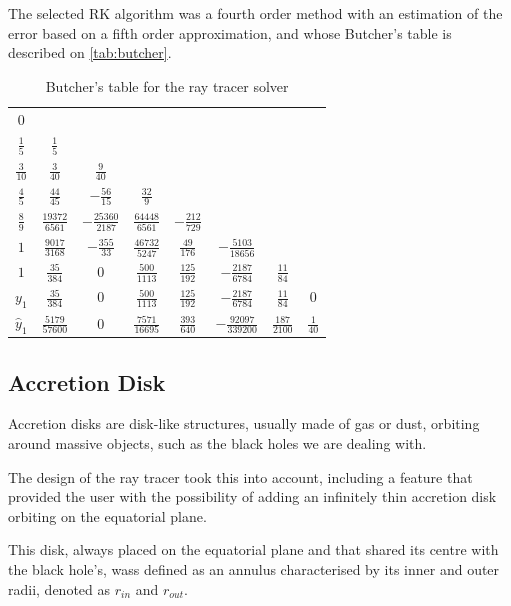 The selected \ac{RK} algorithm was a fourth order method with an estimation of the error based on a fifth order approximation, and whose Butcher's table is described on \autoref{tab:butcher}.

\begin{table}[bth]
	\myfloatalign
	\begin{tabularx}{.9\textwidth}{c|ccccccc}
		$0$&  & & & & & & \\
		$\frac{1}{5}$&  $\frac{1}{5}$& & & & & & \\
		$\frac{3}{10}$&  $\frac{3}{40}$&  $\frac{9}{40}$& & & & & \\
		$\frac{4}{5}$&  $\frac{44}{45}$&  $-\frac{56}{15}$&  $\frac{32}{9}$& & & & \\
		$\frac{8}{9}$&  $\frac{19372}{6561}$&  $-\frac{25360}{2187}$&  $\frac{64448}{6561}$&  $-\frac{212}{729}$& & & \\
		$1$&  $\frac{9017}{3168}$&  $-\frac{355}{33}$&  $\frac{46732}{5247}$&  $\frac{49}{176}$&  $-\frac{5103}{18656}$& & \\
		$1$&  $\frac{35}{384}$&  $0$&  $\frac{500}{1113}$&  $\frac{125}{192}$&  $-\frac{2187}{6784}$&  $\frac{11}{84}$& \\ \hline
		$y_1$&  $\frac{35}{384}$&  $0$&  $\frac{500}{1113}$&  $\frac{125}{192}$&  $-\frac{2187}{6784}$&  $\frac{11}{84}$&  $0$ \\ \hline
		$\widehat{y}_1$&  $\frac{5179}{57600}$&  $0$&  $\frac{7571}{16695}$&  $\frac{393}{640}$&  $-\frac{92097}{339200}$&  $\frac{187}{2100}$&  $\frac{1}{40}$
	\end{tabularx}
	\caption{Butcher's table for the ray tracer solver}
	\label{tab:butcher}
\end{table}

\subsection{Accretion Disk}

Accretion disks are disk-like structures, usually made of gas or dust, orbiting around massive objects, such as the black holes we are dealing with.

The design of the ray tracer took this into account, including a feature that provided the user with the possibility of adding an infinitely thin accretion disk orbiting on the equatorial plane.

This disk, always placed on the equatorial plane and that shared its centre with the black hole's, wass defined as an annulus characterised by its inner and outer radii, denoted as $r_{in}$ and $r_{out}$.

